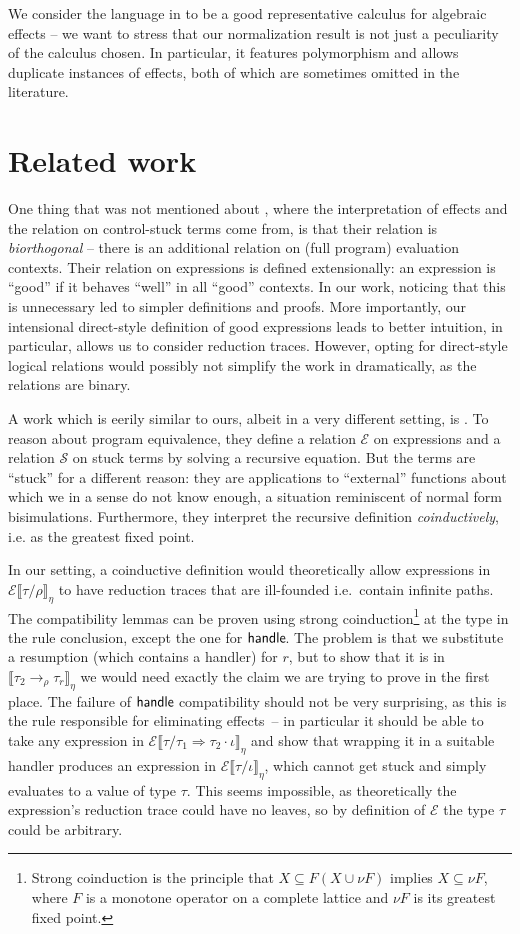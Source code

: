 \documentclass[a4paper, 11pt,titlepage, openright, twoside]{report}
\newcommand{\keyword}[1]{\textsf{\textup{#1}}}
\newcommand{\Handle}{\keyword{handle}\;}
\newcommand{\E}{\mathcal{E}}
\renewcommand{\S}{\mathcal{S}}
\newcommand{\+}{\enspace}
\begin{document}
We consider the language in \cite{hwc} to be a good representative
calculus for algebraic effects
– we want to stress that our normalization result is not just a
peculiarity of the calculus chosen.
In particular, it features polymorphism and allows duplicate instances of effects,
both of which are sometimes omitted in the literature.

\section{Related work}

One thing that was not mentioned about \cite{hwc}, where the interpretation of effects
and the relation on control-stuck terms come from,
is that their relation is {\em biorthogonal}
– there is an additional relation on (full program) evaluation contexts.
Their relation on expressions is defined extensionally:
an expression is ``good'' if it behaves ``well'' in all ``good'' contexts.
In our work, noticing that this is unnecessary led to simpler definitions and proofs.
More importantly, our intensional direct-style definition of good expressions leads to
better intuition, in particular, allows us to consider reduction traces.
However, opting for direct-style logical relations would possibly not simplify the work
in \cite{hwc} dramatically,
as the relations are binary.

A work which is eerily similar to ours, albeit in a very different setting, is \cite{marriage}.
To reason about program equivalence,
they define a relation $\E$ on expressions
and a relation $\S$ on stuck terms
by solving a recursive equation.
But the terms are ``stuck'' for a different reason:
they are applications to ``external'' functions about which we in a sense do not know enough,
a situation reminiscent of normal form bisimulations.
Furthermore, they interpret the recursive definition {\em coinductively},
i.e. as the greatest fixed point.

In our setting, a coinductive definition would theoretically allow
expressions in $\E⟦τ/ρ⟧_η$ to have reduction traces that are ill-founded
i.e.\ contain infinite paths.
The compatibility lemmas can be proven using strong coinduction\footnote{
	Strong coinduction is the principle that $X ⊆ F(X ∪ νF)$ implies $X ⊆ νF$,
	where $F$ is a monotone operator on a complete lattice and $νF$ is its greatest fixed point.
}
	at the type in the rule conclusion,
except the one for $\Handle\!\!$.
The problem is that we substitute a resumption
(which contains a handler) for $r$,
but to show that it is in $⟦τ_2 →_ρ τ_r⟧_η$
we would need exactly the claim we are trying to prove in the first place.
The failure of $\Handle\!\!$ compatibility should not be very surprising,
as this is the rule responsible for eliminating effects –
in particular it should be able to take
any expression in $\E⟦τ/τ_1 \Rightarrow τ_2 · ι⟧_η$ and show that wrapping it in a
suitable handler produces an expression in $\E⟦τ/ι⟧_η$, which cannot get
stuck and simply evaluates to a value of type $τ$.
This seems impossible,
as theoretically the expression's reduction trace could have no
leaves, so by definition of $\E$ the type $τ$ could be arbitrary.
\end{document}
